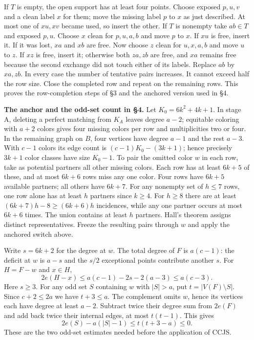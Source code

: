 \documentclass[english,11pt,a4paper]{article}
\newcounter{none}
\begin{document}
If \(T\) is empty, the open support has at least four points. Choose exposed \(p,u,v\) and a clean label \(x\) for them; move the missing label \(p\) to \(x\) as just described. At most one of \(xu,xv\) became used, so insert the other. If \(T\) is nonempty take \(ab\in T\) and exposed \(p,u\). Choose \(x\) clean for \(p,u,a,b\) and move \(p\) to \(x\). If \(xu\) is free, insert it. If it was lost, \(xa\) and \(xb\) are free. Now choose \(z\) clean for \(u,x,a,b\) and move \(u\) to \(z\). If \(xz\) is free, insert it; otherwise both \(za,zb\) are free, and \(xa\) remains free because the second exchange did not touch either of its labels. Replace \(ab\) by \(xa,zb\). In every case the number of tentative pairs increases. It cannot exceed half the row size. Close the completed row and repeat on the remaining rows. This proves the row-completion steps of §3 and the anchored version used in §4.

\textbf{The anchor and the odd-set count in §4.} Let \(K_0=6k^2+4k+1\). In stage A, deleting a perfect matching from \(K_A\) leaves degree \(a-2\); equitable coloring with \(a+2\) colors gives four missing colors per row and multiplicities two or four. In the remaining graph on \(B\), four vertices have degree \(a-1\) and the rest \(a-3\). With \(c-1\) colors its edge count is \((c-1)K_0-(3k+1)\); hence precisely \(3k+1\) color classes have size \(K_0-1\). To pair the omitted color \(w\) in each row, take as potential partners all other missing colors. Each row has at least \(6k+5\) of these, and at most \(6k+6\) rows miss any one color. Four rows have \(6k+5\) available partners; all others have \(6k+7\). For any nonempty set of \(h\le7\) rows, one row alone has at least \(h\) partners since \(k\ge4\). For \(h\ge8\) there are at least \((6k+7)h-8\ge(6k+6)h\) incidences, while any one partner occurs at most \(6k+6\) times. The union contains at least \(h\) partners. Hall's theorem assigns distinct representatives. Freeze the resulting pairs through \(w\) and apply the anchored switch above.

Write \(s=6k+2\) for the degree at \(w\). The total degree of \(F\) is \(a(c-1)\): the deficit at \(w\) is \(a-s\) and the \(s/2\) exceptional points contribute another \(s\). For \(H=F-w\) and \(x\in H\), \[2e(H-x)\le a(c-1)-2s-2(a-3)\le a(c-3).\] Here \(s\ge3\). For any odd set \(S\) containing \(w\) with \(|S|>a\), put \(t=|V(F)\setminus S|\). Since \(c+2\le2a\) we have \(t+3\le a\). The complement omits \(w\), hence its vertices each have degree at least \(a-2\). Subtract twice their degree sum from \(2e(F)\) and add back twice their internal edges, at most \(t(t-1)\). This gives \[2e(S)-a(|S|-1)\le t(t+3-a)\le0.\] These are the two odd-set estimates needed before the application of CCJS.
\end{document}
